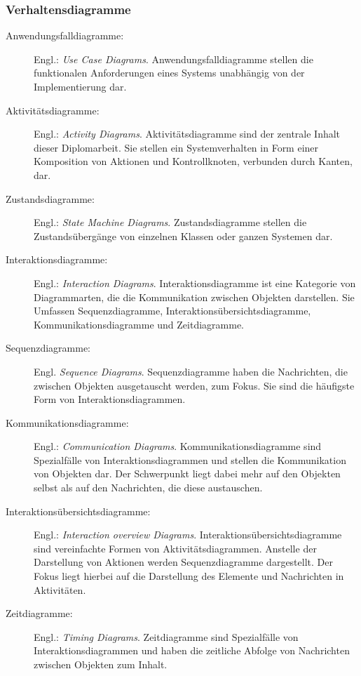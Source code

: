 \subsubsection{Verhaltensdiagramme}
\begin{description}
\item[Anwendungsfalldiagramme:] Engl.: \emph{Use Case Diagrams}. Anwendungsfalldiagramme stellen die funktionalen Anforderungen eines Systems unabhängig von der Implementierung dar.
\item[Aktivitätsdiagramme:] Engl.: \emph{Activity Diagrams}. Aktivitätsdiagramme sind der zentrale Inhalt dieser Diplomarbeit. Sie stellen ein Systemverhalten in Form einer Komposition von Aktionen und Kontrollknoten, verbunden durch Kanten, dar.
\item[Zustandsdiagramme:] Engl.: \emph{State Machine Diagrams}. Zustandsdiagramme stellen die Zustandsübergänge von einzelnen Klassen oder ganzen Systemen dar.
\item[Interaktionsdiagramme:] Engl.: \emph{Interaction Diagrams}. Interaktionsdiagramme ist eine Kategorie von Diagrammarten, die die Kommunikation zwischen Objekten darstellen. Sie Umfassen Sequenzdiagramme, Interaktions\-über\-sichts\-diagramme, Kommunikationsdiagramme und Zeitdiagramme.
\item[Sequenzdiagramme:] Engl. \emph{Sequence Diagrams}. Sequenzdiagramme haben die Nachrichten, die zwischen Objekten ausgetauscht werden, zum Fokus. Sie sind die häufigste Form von Interaktionsdiagrammen.
\item[Kommunikationsdiagramme:] Engl.: \emph{Communication Diagrams}. Kommunikationsdiagramme sind Spezialfälle von Interaktionsdiagrammen und stellen die Kommunikation von Objekten dar. Der Schwerpunkt liegt dabei mehr auf den Objekten selbst als auf den Nachrichten, die diese austauschen.
\item[Interaktionsübersichtsdiagramme:] Engl.: \emph{Interaction overview Diagrams}. Interaktionsübersichtsdiagramme sind vereinfachte Formen von Aktivitäts\-diagrammen. Anstelle der Darstellung von Aktionen werden Sequenzdiagramme dargestellt. Der Fokus liegt hierbei auf die Darstellung des Elemente und Nachrichten in Aktivitäten.
\item[Zeitdiagramme:] Engl.: \emph{Timing Diagrams}. Zeitdiagramme sind Spezialfälle von Interaktionsdiagrammen und haben die zeitliche Abfolge von Nachrichten zwischen Objekten zum Inhalt.
\end{description}



















